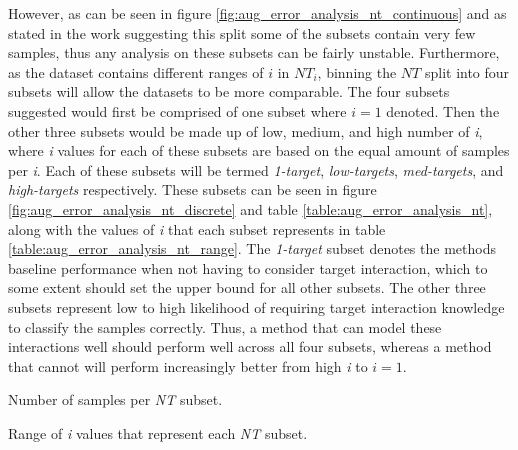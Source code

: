 However, as can be seen in figure \ref{fig:aug_error_analysis_nt_continuous} and as stated in the work suggesting this split \citep{zhang-etal-2019-aspect} some of the subsets contain very few samples, thus any analysis on these subsets can be fairly unstable. Furthermore, as the dataset contains different ranges of $i$ in $NT_i$, binning the $NT$ split into four subsets will allow the datasets to be more comparable. The four subsets suggested would first be comprised of one subset where $i=1$ denoted. Then the other three subsets would be made up of low, medium, and high number of \textit{i}, where \textit{i} values for each of these subsets are based on the equal amount of samples per \textit{i}. Each of these subsets will be termed  \textit{1-target}, \textit{low-targets}, \textit{med-targets}, and \textit{high-targets} respectively. These subsets can be seen in figure \ref{fig:aug_error_analysis_nt_discrete} and table \ref{table:aug_error_analysis_nt}, along with the values of \textit{i} that each subset represents in table \ref{table:aug_error_analysis_nt_range}. The \textit{1-target} subset denotes the methods baseline performance when not having to consider target interaction, which to some extent should set the upper bound for all other subsets. The other three subsets represent low to high likelihood of requiring target interaction knowledge to classify the samples correctly. Thus, a method that can model these interactions well should perform well across all four subsets, whereas a method that cannot will perform increasingly better from high \textit{i} to $i=1$.
\begin{table}[!ht]
    \centering
    
    \caption{Number of samples per \textit{NT} subset.}
    \label{table:aug_error_analysis_nt}
\end{table}

\begin{table}[!ht]
    \centering
    
    \caption{Range of \textit{i} values that represent each \textit{NT} subset.}
    \label{table:aug_error_analysis_nt_range}
\end{table}

